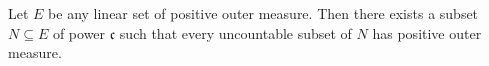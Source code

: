 Let $E$ be any linear set of positive outer measure. Then there exists a subset $N \subseteq E$ of power $\mathfrak{c}$ such that every uncountable subset of $N$ has positive outer measure.
